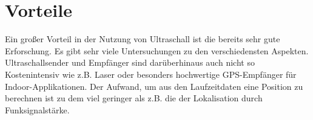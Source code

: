 \section{Vorteile}
Ein großer Vorteil in der Nutzung von Ultraschall ist die bereits sehr gute
Erforschung. Es gibt sehr viele Untersuchungen zu den verschiedensten
Aspekten. Ultraschallsender und Empfänger sind darüberhinaus auch nicht so
Kostenintensiv wie z.B. Laser oder besonders hochwertige GPS-Empfänger für
Indoor-Applikationen. Der Aufwand, um aus den Laufzeitdaten eine Position zu
berechnen ist zu dem viel geringer als z.B. die der Lokalisation durch
Funksignalstärke.

\cleardoublepage
